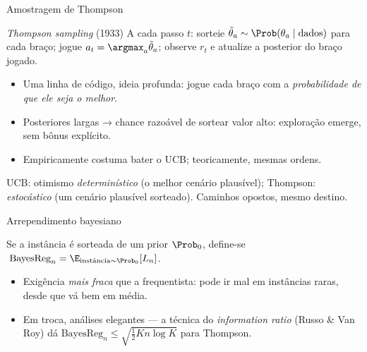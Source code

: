 \documentclass[aspectratio=169, 11pt]{beamer}
\begin{document}
\begin{frame}{Amostragem de Thompson}
  \begin{algbox}{\emph{Thompson sampling} (1933)}
    {\small A cada passo $t$: sorteie $\tilde\theta_a \sim
    \Prob(\theta_a\mid \text{dados})$ para cada braço; jogue
    $a_t = \argmax_a \tilde\theta_a$; observe $r_t$ e atualize a posterior do
    braço jogado.}
  \end{algbox}

  {\small
  \begin{itemize}\setlength{\itemsep}{0.2ex}
    \item Uma linha de código, ideia profunda: jogue cada braço com a
          \emph{probabilidade de que ele seja o melhor}.
    \item Posteriores largas → chance razoável de sortear valor alto:
          exploração \alert{emerge}, sem bônus explícito.
    \item Empiricamente costuma bater o UCB; teoricamente, mesmas ordens.
  \end{itemize}}

  \begin{ideiabox}
    UCB: otimismo \emph{determinístico} (o melhor cenário plausível);
    Thompson: \emph{estocástico} (um cenário plausível sorteado). Caminhos
    opostos, mesmo destino.
  \end{ideiabox}
\end{frame}

\begin{frame}{Arrependimento bayesiano}
  \begin{defbox}{}
    Se a instância é sorteada de um prior $\Prob_0$, define-se
    $\;\mathrm{BayesReg}_n = \E_{\text{instância}\sim\Prob_0}[L_n]$.
  \end{defbox}

  {\small
  \begin{itemize}\setlength{\itemsep}{0.2ex}
    \item Exigência \emph{mais fraca} que a frequentista: pode ir mal em
          instâncias raras, desde que vá bem em média.
    \item Em troca, análises elegantes --- a técnica do \emph{information
          ratio} (Russo \& Van Roy) dá
          $\mathrm{BayesReg}_n \le \sqrt{\tfrac12 Kn\log K}$ para Thompson.
  \end{itemize}}

\end{frame}
\end{document}
